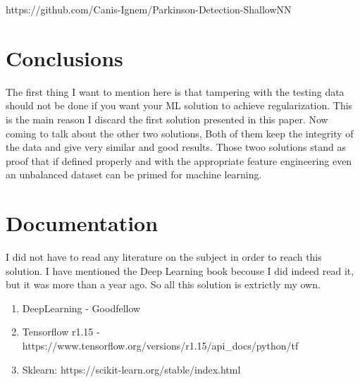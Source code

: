 \documentclass{article} %
\begin{document}
https://github.com/Canis-Ignem/Parkinson-Detection-ShallowNN


\bigskip
\bigskip
\bigskip
\bigskip
\bigskip
\bigskip
\bigskip
\bigskip
\bigskip
\bigskip

\section{Conclusions}

The first thing I want to mention here is that tampering with the testing data should not be done if you want your ML solution to achieve regularization. This is the main reason I discard the first solution presented in this paper. Now coming to talk about the other two solutions, Both of them keep the integrity of the data and give very similar and good results. Those twoo solutions stand as proof that if defined properly and with the appropriate feature engineering even an unbalanced dataset can be primed for machine learning.
\section{Documentation} 

I did not have to read any literature on the subject in order to reach this solution. I have mentioned the Deep Learning book becouse I did indeed read it, but it was more than a year ago. So all this solution is extrictly my own.

\begin{enumerate} 

\item DeepLearning - Goodfellow

\item Tensorflow r1.15 - https://www.tensorflow.org/versions/r1.15/api\_docs/python/tf 
 
\item Sklearn: https://scikit-learn.org/stable/index.html



\end{enumerate} 
\end{document}
